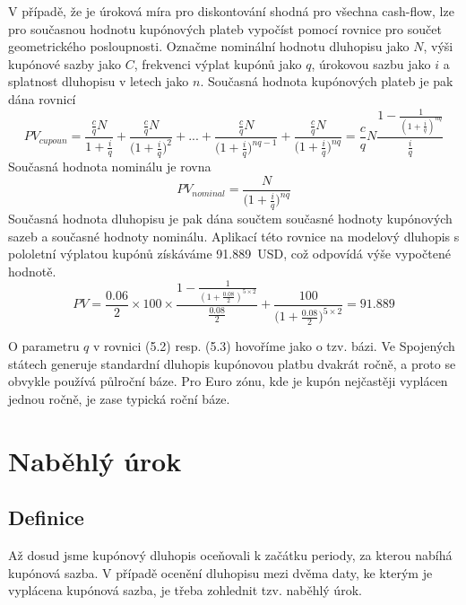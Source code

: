 \documentclass[a4paper]{book}
\begin{document}
V případě, že je úroková míra pro diskontování shodná pro všechna cash-flow, lze pro současnou hodnotu kupónových plateb vypočíst pomocí rovnice pro součet geometrického posloupnosti. Označme nominální hodnotu dluhopisu jako $N$, výši kupónové sazby jako $C$, frekvenci výplat kupónů jako $q$, úrokovou sazbu jako $i$ a splatnost dluhopisu v letech jako $n$. Současná hodnota kupónových plateb je pak dána rovnicí
\begin{equation}
PV_{cupoun} = \frac{\frac{c}{q}N}{1 + \frac{i}{q}} + \frac{\frac{c}{q}N}{\big(1 + \frac{i}{q} \big)^2} + ... + \frac{\frac{c}{q}N}{\big(1 + \frac{i}{q} \big)^{nq - 1}} + \frac{\frac{c}{q}N}{\big(1 + \frac{i}{q} \big)^{nq}} =  \frac{c}{q}N \frac{1 - \frac{1}{(1 + \frac{i}{q})^{nq}}}{\frac{i}{q}}
\end{equation}
Současná hodnota nominálu je rovna
\begin{equation}
PV_{nominal} = \frac{N}{\big( 1 + \frac{i}{q} \big)^{nq}}
\end{equation}
Současná hodnota dluhopisu je pak dána součtem současné hodnoty kupónových sazeb a současné hodnoty nominálu. Aplikací této rovnice na modelový dluhopis s pololetní výplatou kupónů získáváme 91.889~USD, což odpovídá výše vypočtené hodnotě.
\begin{equation*}
PV =  \frac{0.06}{2} \times 100 \times \frac{1 - \frac{1}{(1 + \frac{0.08}{2})^{5 \times 2}}}{\frac{0.08}{2}} + \frac{100}{\big(1 + \frac{0.08}{2}\big)^{5 \times 2}} = 91.889
\end{equation*}

O parametru $q$ v rovnici (5.2) resp. (5.3) hovoříme jako o tzv. bázi. Ve Spojených státech generuje standardní dluhopis kupónovou platbu dvakrát ročně, a proto se obvykle používá půlroční báze. Pro Euro zónu, kde je kupón nejčastěji vyplácen jednou ročně, je zase typická roční báze.

\section{Naběhlý úrok}

\subsection{Definice}

 Až dosud jsme kupónový dluhopis oceňovali k začátku periody, za kterou nabíhá kupónová sazba. V případě ocenění dluhopisu mezi dvěma daty, ke kterým je vyplácena kupónová sazba, je třeba zohlednit tzv. naběhlý úrok.
\end{document}
